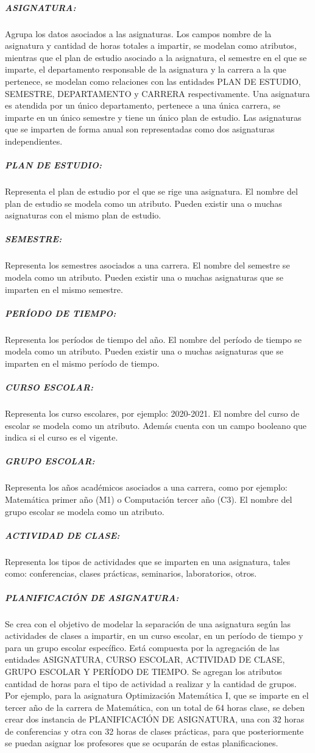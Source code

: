 \subparagraph{ASIGNATURA:}
Agrupa los datos asociados a las asignaturas.
Los campos nombre de la asignatura y cantidad de horas 
totales a impartir, se modelan como atributos, mientras que
el plan de estudio asociado a la asignatura, el semestre en el que se 
imparte, el departamento responsable de la asignatura y la carrera a la 
que pertenece, se modelan como relaciones con las entidades
PLAN DE ESTUDIO, SEMESTRE, DEPARTAMENTO y CARRERA respectivamente. Una asignatura 
es atendida por un único departamento, pertenece a una única carrera, se imparte en un 
único semestre y tiene un único plan de estudio. Las asignaturas que se imparten de forma 
anual son representadas como dos asignaturas independientes.

\subparagraph{PLAN DE ESTUDIO:}
Representa el plan de estudio por el que se rige una asignatura.
El nombre del plan de estudio se modela como un atributo.
Pueden existir una o muchas asignaturas con el mismo plan de estudio.



\subparagraph{SEMESTRE:}
Representa los semestres asociados a una carrera. 
El nombre del semestre se modela como un atributo.
Pueden existir una o muchas asignaturas que se imparten en 
el mismo semestre. 


\subparagraph{PERÍODO DE TIEMPO:}
Representa los períodos de tiempo del año.
El nombre del período de tiempo se modela como un atributo.
Pueden existir una o muchas asignaturas que se imparten en 
el mismo período de tiempo.

\subparagraph{CURSO ESCOLAR:}
Representa los curso escolares, por ejemplo: 2020-2021.
El nombre del curso de escolar se modela como un atributo. Además 
cuenta con un campo booleano que indica si el curso es el vigente.

\subparagraph{GRUPO ESCOLAR:}
Representa los años académicos asociados a una carrera, como por ejemplo:
Matemática primer año (M1) o Computación tercer año (C3).
El nombre del grupo escolar se modela como un atributo.

\subparagraph{ACTIVIDAD DE CLASE:}
Representa los tipos de actividades que se imparten en una asignatura, 
tales como: conferencias, clases prácticas, seminarios, laboratorios, otros. 

\subparagraph{PLANIFICACIÓN DE ASIGNATURA:}
Se crea con el objetivo de modelar la separación de una asignatura
según las actividades de clases a impartir, en un curso escolar, en un período de tiempo y para
un grupo escolar específico. Está compuesta por la agregación de las entidades ASIGNATURA, CURSO ESCOLAR, ACTIVIDAD DE CLASE, GRUPO 
ESCOLAR Y PERÍODO DE TIEMPO.
Se agregan los atributos cantidad de horas para el tipo de actividad a realizar y 
la cantidad de grupos.
Por ejemplo, para la asignatura Optimización Matemática I, que se imparte 
en el tercer año de la carrera de Matemática, con un total de 64 horas clase, 
se deben crear dos instancia de PLANIFICACIÓN DE ASIGNATURA, una con 32 horas 
de conferencias y otra con 32 horas de clases prácticas, para que posteriormente
se puedan asignar los profesores que se ocuparán de estas planificaciones. 




